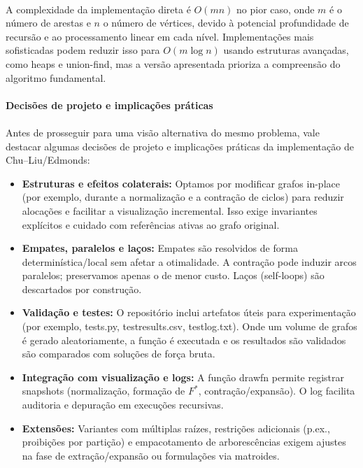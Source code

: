 \documentclass[12pt,a4paper]{article}
\def\texttt#1{#1}%
\def\emph#1{#1}%
\def\_{}%
\begin{document}
\paragraph{}
A complexidade da implementação direta é \(O(mn)\) no pior caso, onde \(m\) é o número de arestas e \(n\) o número de vértices, devido à potencial profundidade de recursão e ao processamento linear em cada nível. Implementações mais sofisticadas podem reduzir isso para \(O(m \log n)\) usando estruturas avançadas, como heaps e union-find, mas a versão apresentada prioriza a compreensão do algoritmo fundamental.


\paragraph{Decisões de projeto e implicações práticas}
\paragraph{}
Antes de prosseguir para uma visão alternativa do mesmo problema, vale destacar algumas decisões de projeto e implicações práticas da implementação de Chu–Liu/Edmonds:
\begin{itemize}\setlength{\itemsep}{2pt}
    \item \textbf{Estruturas e efeitos colaterais:} Optamos por modificar grafos \emph{in-place} (por exemplo, durante a normalização e a contração de ciclos) para reduzir alocações e facilitar a visualização incremental. Isso exige invariantes explícitos e cuidado com referências ativas ao grafo original.
    \item \textbf{Empates, paralelos e laços:} Empates são resolvidos de forma determinística/local sem afetar a otimalidade. A contração pode induzir \emph{arcos paralelos}; preservamos apenas o de menor custo. Laços (self-loops) são descartados por construção.
    \item \textbf{Validação e testes:}  O repositório inclui artefatos úteis para experimentação (por exemplo, \texttt{tests.py}, \texttt{test\_results.csv}, \texttt{test\_log.txt}). Onde um volume de grafos é gerado aleatoriamente, a função é executada e os resultados são validados são comparados com soluções de força bruta.
    \item \textbf{Integração com visualização e logs:} A função \texttt{draw\_fn} permite registrar \emph{snapshots} (normalização, formação de \(F^*\), contração/expansão). O \texttt{log} facilita auditoria e depuração em execuções recursivas.
    \item \textbf{Extensões:} Variantes com múltiplas raízes, restrições adicionais (p.ex., proibições por partição) e empacotamento de arborescências exigem ajustes na fase de extração/expansão ou formulações via matroides.
\end{itemize}
\end{document}
